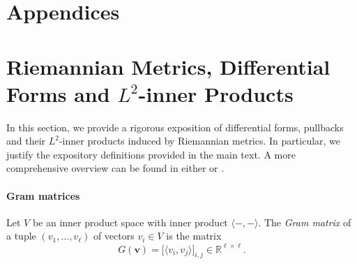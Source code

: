 \documentclass{article}
\newcommand{\R}{\mathbb{R}}
\let\todo\undefined
\let\todo\undefined
\newcommand{\todo}[1][]{}
\newcommand{\toref}[1][]{}
\theoremstyle{remark}
\theoremstyle{plain}
\begin{document}
\newpage
\appendix

\section*{Appendices}






\tableofcontents

\section{Riemannian Metrics, Differential Forms and $L^2$-inner Products}
\label{app:background-diff-forms}
\label{appendix:A-smooth-review}

In this section, we provide a rigorous exposition of differential forms, pullbacks and their $L^2$-inner products induced by Riemannian metrics. In particular, we justify the expository definitions provided in the main text. A more comprehensive overview can be found in either \cite{Lee2018} or \cite{Jost2017}.


\paragraph{Gram matrices} Let $V$ be an inner product space with inner product $\langle-, -\rangle$. The \textit{Gram matrix} of a tuple $(v_1, \ldots, v_\ell)$ of vectors $v_i \in V$ is the matrix
\begin{equation}
    G(\mathbf{v}) = \Big[ \langle v_i,v_j \rangle \Big]_{i,j} \in \R^{\ell \times \ell}.
\end{equation}
\end{document}
